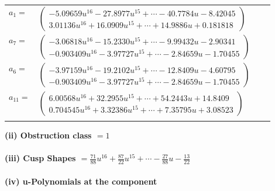 \documentclass[1p]{elsarticle_modified}
\theoremstyle{definition}
\begin{document}
\begin{tabular}{m{7pt} m{180pt} m{7pt} m{180pt} }
\flushright $a_{1}=$&$\begin{pmatrix}-5.09659 u^{16}-27.8977 u^{15}+\cdots-40.7784 u-8.42045\\3.01136 u^{16}+16.0909 u^{15}+\cdots+14.9886 u+0.181818\end{pmatrix}$ \\
\flushright $a_{7}=$&$\begin{pmatrix}-3.06818 u^{16}-15.2330 u^{15}+\cdots-9.99432 u-2.90341\\-0.903409 u^{16}-3.97727 u^{15}+\cdots-2.84659 u-1.70455\end{pmatrix}$ \\
\flushright $a_{6}=$&$\begin{pmatrix}-3.97159 u^{16}-19.2102 u^{15}+\cdots-12.8409 u-4.60795\\-0.903409 u^{16}-3.97727 u^{15}+\cdots-2.84659 u-1.70455\end{pmatrix}$ \\
\flushright $a_{11}=$&$\begin{pmatrix}6.00568 u^{16}+32.2955 u^{15}+\cdots+54.2443 u+14.8409\\0.704545 u^{16}+3.32386 u^{15}+\cdots+7.35795 u+3.08523\end{pmatrix}$\\&\end{tabular}
\flushleft \textbf{(ii) Obstruction class $= 1$}\\~\\
\flushleft \textbf{(iii) Cusp Shapes $= \frac{71}{88} u^{16}+\frac{87}{22} u^{15}+\cdots-\frac{27}{88} u-\frac{13}{22}$}\\~\\
\newpage\renewcommand{\arraystretch}{1}
\flushleft \textbf{(iv) u-Polynomials at the component}\newline \\
\end{document}
